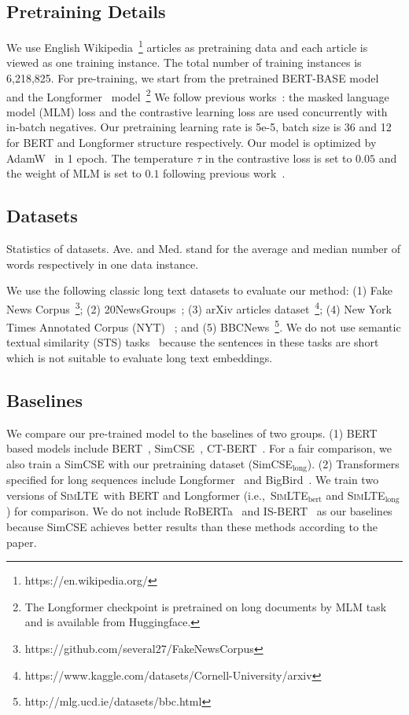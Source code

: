 \documentclass[11pt]{article}
\newcommand{\our}{\mbox{\textsc{SimLTE}}}
\begin{document}
\subsection{Pretraining Details}
We use English Wikipedia~\footnote{https://en.wikipedia.org/} articles as pretraining data and each article is viewed as one training instance. 
The total number of training instances is 6,218,825. For pre-training, we start from the pretrained BERT-BASE model~\cite{Devlin2019BERTPO} and the Longformer~\cite{Beltagy2020LongformerTL} model~\footnote{The Longformer checkpoint is pretrained on long documents by MLM task and is available from Huggingface.} 
We follow previous works~\cite{Gao2021SimCSESC, Li2022UCTopicUC}: the masked language model (MLM) loss and the contrastive learning loss are used concurrently with in-batch negatives. 
Our pretraining learning rate is 5e-5, batch size is 36 and 12 for BERT and Longformer structure respectively. Our model is optimized by AdamW~\cite{Kingma2014AdamAM} in 1 epoch. 
The temperature $\tau$ in the contrastive loss is set to $0.05$ and the weight of MLM is set to $0.1$ following previous work~\cite{Gao2021SimCSESC}.

\subsection{Datasets}
\begin{table}[h]
\centering
    
    \caption{Statistics of datasets. Ave. and Med. stand for the average and median number of words respectively in one data instance.}
    \label{dataset}
\end{table}

We use the following classic long text datasets to evaluate our method:
(1) Fake News Corpus~\footnote{https://github.com/several27/FakeNewsCorpus};
(2) 20NewsGroups~\cite{Lang1995NewsWeederLT};
(3) arXiv articles dataset~\footnote{https://www.kaggle.com/datasets/Cornell-University/arxiv};
(4) New York Times Annotated Corpus (NYT) ~\cite{sandhaus2008new}; and
(5) BBCNews~\footnote{http://mlg.ucd.ie/datasets/bbc.html}.
We do not use semantic textual similarity (STS) tasks~\cite{Agirre2012SemEval2012T6} because the sentences in these tasks are short which is not suitable to evaluate long text embeddings.


\subsection{Baselines}
We compare our pre-trained model to the baselines of two groups.
(1) BERT based models include BERT~\cite{Devlin2019BERTPO}, SimCSE~\cite{Gao2021SimCSESC}, CT-BERT~\cite{Carlsson2021SemanticRW}. For a fair comparison, we also train a SimCSE with our pretraining dataset (SimCSE$_\mathrm{long}$).
(2) Transformers specified for long sequences include Longformer~\cite{Beltagy2020LongformerTL} and BigBird~\cite{Zaheer2020BigBT}.
We train two versions of \our~with BERT and Longformer (i.e.,~\our$_\mathrm{bert}$ and \our$_{\mathrm{long}}$) for comparison.
We do not include RoBERTa~\cite{Liu2019RoBERTaAR} and IS-BERT~\cite{Zhang2020AnUS} as our baselines because SimCSE achieves better results than these methods according to the paper.
\end{document}
